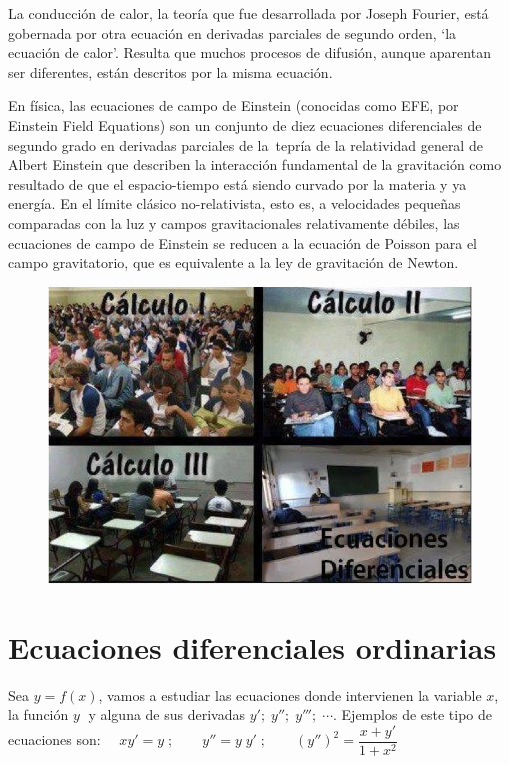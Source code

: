 La conducción de calor, la teoría que fue desarrollada por Joseph Fourier, está gobernada por otra ecuación en derivadas parciales de segundo orden, `la ecuación de calor'. Resulta que muchos procesos de difusión, aunque aparentan ser diferentes, están descritos por la misma ecuación. 

\footnotesize{\textcolor{gris}{En física, las ecuaciones de campo de Einstein (conocidas como EFE, por Einstein Field Equations) son un conjunto de diez ecuaciones diferenciales de segundo grado en derivadas parciales de la tepría de la relatividad general de Albert Einstein que describen la interacción fundamental de la gravitación como resultado de que el espacio-tiempo está siendo curvado por la materia y ya energía. En el límite clásico no-relativista, esto es, a velocidades pequeñas  comparadas con la luz y campos gravitacionales relativamente débiles, las ecuaciones de campo de Einstein se reducen a la ecuación de Poisson para el campo gravitatorio, que es equivalente a la ley de gravitación de Newton}}\normalsize{.}

\rightline{\textcolor{gris}{Fuente: Wikipedia}}


	\begin{figure}[H]
 		\centering
		\includegraphics[width=1\textwidth]{imagenes/imagenes09/T09IM01.png}
	\end{figure}


\section{Ecuaciones diferenciales ordinarias}
	
	Sea $y=f(x)$, vamos a estudiar las ecuaciones donde intervienen la variable $x$, la función $y\;$ y alguna de sus derivadas $y';\; y''; \; y'''; \; \cdots$. Ejemplos de este tipo de ecuaciones son:
	$\quad xy'= y\; ; \qquad y''=y\; y'\; ; \qquad (y'')^2=\dfrac {x+y'}{1+x^2}$
	
